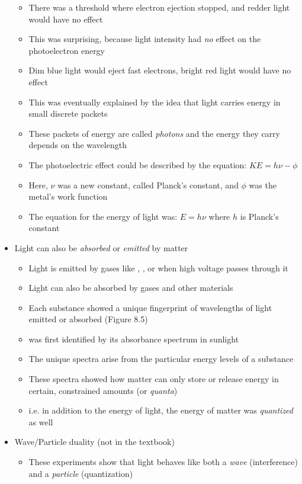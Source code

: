 \documentclass[12pt, openany, letterpaper]{memoir}
\begin{document}
\begin{itemize}
\begin{itemize}
		\item There was a threshold where electron ejection stopped, and redder light would have no effect
		\item This was surprising, because light intensity had \emph{no} effect on the photoelectron energy
		\item Dim blue light would eject fast electrons, bright red light would have no effect
		\item This was eventually explained by the idea that light carries energy in small discrete packets
		\item These packets of energy are called \emph{photons} and the energy they carry depends on the wavelength
		\item The photoelectric effect could be described by the equation: $KE = h\nu - \phi$
		\item Here, $\nu$ was a new constant, called Planck's constant, and $\phi$ was the metal's work function
		\item The equation for the energy of light was: $E=h\nu$ where $h$ is Planck's constant
	\end{itemize}
	\item Light can also be \emph{absorbed} or \emph{emitted} by matter
	\begin{itemize}
		\item Light is emitted by gases like , , or  when high voltage passes through it
		\item Light can also be absorbed by gases and other materials
		\item Each substance showed a unique fingerprint of wavelengths of light emitted or absorbed (Figure 8.5)
		\item {} was first identified by its absorbance spectrum in sunlight
		\item The unique spectra arise from the particular energy levels of a substance
		\item These spectra showed how matter can only store or release energy in certain, constrained amounts (or \emph{quanta})
		\item i.e. in addition to the energy of light, the energy of matter was \emph{quantized} as well
	\end{itemize}
	\item Wave/Particle duality (not in the textbook)
	\begin{itemize}
		\item These experiments show that light behaves like both a \emph{wave} (interference) and a \emph{particle} (quantization)

\end{itemize}
\end{itemize}
\end{document}
